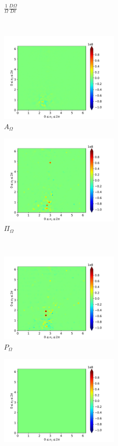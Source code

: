 \begin{figure}[H]
\begin{subfigure}[H]{0.45\textwidth}
        \caption{$\frac{1}{\Omega} \frac{D \Omega}{Dt}$}
    \end{subfigure}
    ~
    \begin{subfigure}{0.45\textwidth}
        \includegraphics[height=1.75in]{media/run-cds-65-5k/A-enst-4750}
        \caption{$A_{\Omega}$}
    \end{subfigure}
    \newline
    \begin{subfigure}{0.45\textwidth}
        \includegraphics[height=1.75in]{media/run-cds-65-5k/Pi-enst-4750}
        \caption{$\Pi_{\Omega}$}
    \end{subfigure}
    ~
    \begin{subfigure}{0.45\textwidth}
        \includegraphics[height=1.75in]{media/run-cds-65-5k/P-enst-4750}
        \caption{$P_{\Omega}$}
    \end{subfigure}
    \newline
    \begin{subfigure}{0.45\textwidth}
        \includegraphics[height=1.75in]{media/run-cds-65-5k/B-enst-4750}

\end{subfigure}
\end{figure}
